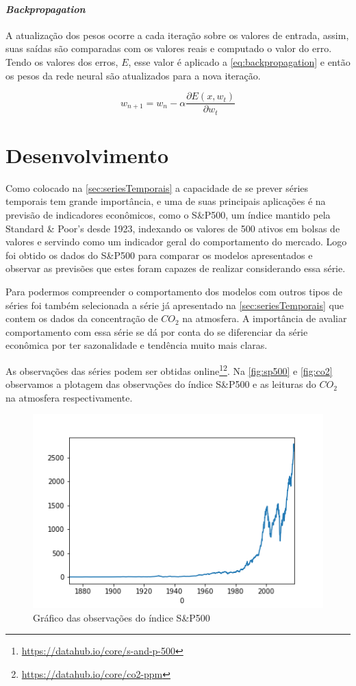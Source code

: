 \documentclass[
    12pt,
    oneside,
    a4paper,
    english,
    brazil
]{abntex2}
\begin{document}
\subsubsection{\textit{Backpropagation}}

A atualização  dos pesos ocorre  a cada iteração  sobre os valores  de entrada,
assim,  suas  saídas  são  comparadas  com  os  valores  reais  e  computado  o
valor  do erro.  Tendo os  valores  dos erros,  $E$,  esse valor  é aplicado  a
\autoref{eq:backpropagation} e  então os pesos  da rede neural  são atualizados
para a nova iteração.

\begin{equation}\label{eq:backpropagation}
    w_{n+1} = w_n - \alpha \frac{\partial E(x,w_t)}{\partial w_t}
\end{equation}

\chapter{Desenvolvimento}\label{chap:desenv}

Como colocado na \autoref{sec:seriesTemporais} a capacidade de se prever séries
temporais tem  grande importância,  e uma  de suas  principais aplicações  é na
previsão  de indicadores  econômicos, como  o S\&P500,  um índice  mantido pela
Standard \& Poor's desde 1923, indexando os  valores de 500 ativos em bolsas de
valores e  servindo como um indicador  geral do comportamento do  mercado. Logo
foi obtido os dados do S\&P500 para comparar os modelos apresentados e observar
as previsões que estes foram capazes de realizar considerando essa série.

Para   podermos   compreender   o   comportamento  dos   modelos   com   outros
tipos   de  séries   foi  também   selecionada  a   série  já   apresentado  na
\autoref{sec:seriesTemporais} que contem os dados  da concentração de $CO_2$ na
atmosfera. A  importância de  avaliar comportamento  com essa  série se  dá por
conta do  se diferenciar da  série econômica  por ter sazonalidade  e tendência
muito mais claras.

As observações das séries podem ser obtidas
online\footnote{\url{https://datahub.io/core/s-and-p-500}}\footnote{\url{https://datahub.io/core/co2-ppm}}.
Na   \autoref{fig:sp500}  e   \autoref{fig:co2}  observamos   a  plotagem   das
observações  do   índice  S\&P500  e   as  leituras  do  $CO_2$   na  atmosfera
respectivamente.

\begin{figure}[ht]
    \centering
    \caption{Gráfico das observações do índice S\&P500}\label{fig:sp500}
    \includegraphics[width=.5\linewidth]{images/sp500.png}
\end{figure}
\end{document}
